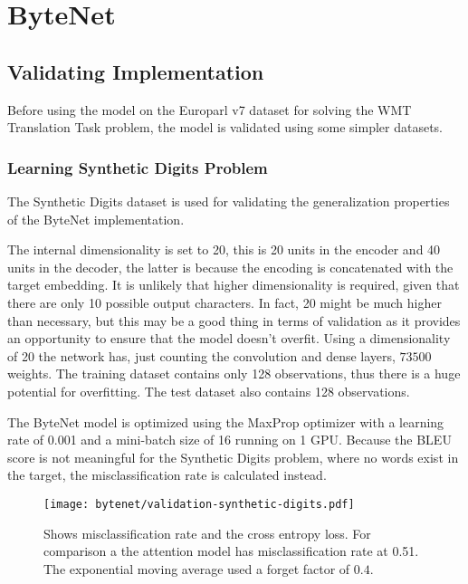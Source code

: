 
\section{ByteNet}

\subsection{Validating Implementation}

Before using the model on the Europarl v7 dataset for solving the WMT Translation Task problem, the model is validated using some simpler datasets.

\subsubsection{Learning Synthetic Digits Problem}

The Synthetic Digits dataset is used for validating the generalization properties of the ByteNet implementation.

The internal dimensionality is set to 20, this is 20 units in the encoder and 40 units in the decoder, the latter is because the encoding is concatenated with the target embedding. It is unlikely that higher dimensionality is required, given that there are only 10 possible output characters. In fact, 20 might be much higher than necessary, but this may be a good thing in terms of validation as it provides an opportunity to ensure that the model doesn't overfit. Using a dimensionality of 20 the network has, just counting the convolution and dense layers, $73500$ weights. The training dataset contains only 128 observations, thus there is a huge potential for overfitting. The test dataset also contains 128 observations.

The ByteNet model is optimized using the MaxProp optimizer with a learning rate of 0.001 and a mini-batch size of 16 running on 1 GPU. Because the BLEU score is not meaningful for the Synthetic Digits problem, where no words exist in the target, the misclassification rate is calculated instead.

\begin{figure}[h]
    \centering
    \texttt{[image: bytenet/validation-synthetic-digits.pdf]}
    \caption{Shows misclassification rate and the cross entropy loss. For comparison a the attention model has misclassification rate at 0.51. The exponential moving average used a forget factor of $0.4$.}
    \label{fig:result:bytenet:digits}
\end{figure}

